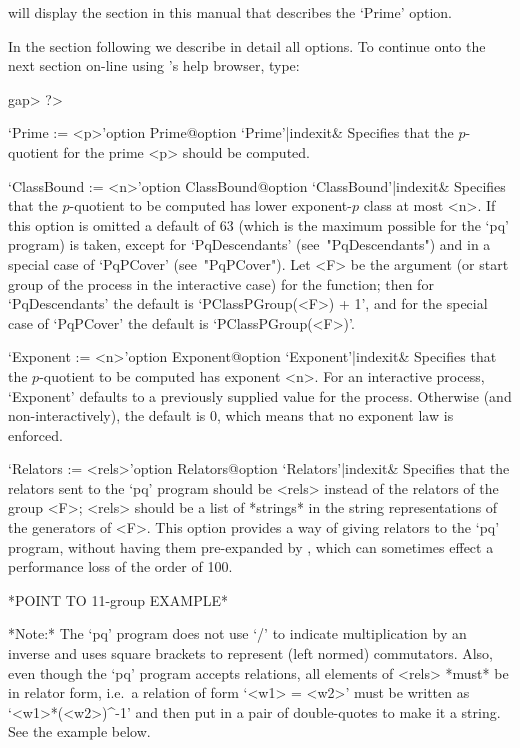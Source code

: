 will display the section  in  this  manual  that  describes  the  `Prime'
option.

In the section following we describe in detail all {\ANUPQ}  options.  To
continue onto the next section on-line using {\GAP}'s help browser, type:

\begintt
gap> ?>
\endtt


\beginitems

\>`Prime := <p>'{option Prime}@{option `Prime'|indexit}&
Specifies that the $p$-quotient for the prime  <p>  should  be  computed.

\>`ClassBound := <n>'{option  ClassBound}@{option  `ClassBound'|indexit}&
Specifies that the $p$-quotient to be  computed  has  lower  exponent-$p$
class at most <n>. If this option is omitted a default of  63  (which  is
the  maximum  possible  for  the  `pq'  program)  is  taken,  except   for
`PqDescendants' (see~"PqDescendants") and in a special case of `PqPCover'
(see~"PqPCover"). Let <F> be the argument (or start group of the  process
in the interactive case) for the function; then for  `PqDescendants'  the
default  is  `PClassPGroup(<F>)  +  1',  and  for  the  special  case  of
`PqPCover' the default is `PClassPGroup(<F>)'.

\>`Exponent := <n>'{option Exponent}@{option `Exponent'|indexit}&
Specifies that the $p$-quotient to be computed has exponent <n>.  For  an
interactive process, `Exponent' defaults to a previously  supplied  value
for the process. Otherwise (and non-interactively),  the  default  is  0,
which means that no exponent law is enforced.

\>`Relators := <rels>'{option Relators}@{option `Relators'|indexit}&
Specifies that the relators sent to the  `pq'  program  should  be  <rels>
instead of the relators of the group <F>; <rels>  should  be  a  list  of
*strings* in the string representations of the generators  of  <F>.  This
option provides a way of giving relators  to  the  `pq'  program,  without
having  them  pre-expanded  by  {\GAP},  which  can  sometimes  effect  a
performance loss of the order of 100.

*POINT TO 11-group EXAMPLE*

*Note:*
The `pq' program does not use `/' to indicate multiplication by an inverse
and uses square brackets to represent (left  normed)  commutators.  Also,
even though the `pq' program accepts relations,  all  elements  of  <rels>
*must* be in relator form, i.e.~a relation of form `<w1> = <w2>' must  be
written as `<w1>*(<w2>)^-1' and then put in a pair  of  double-quotes  to
make it a string. See the example below.

